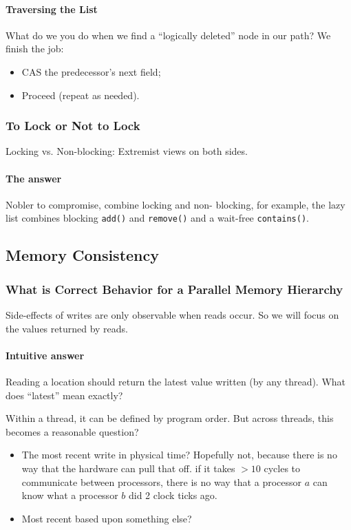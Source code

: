 \paragraph{Traversing the List} What do we you do when we find a \enquote{logically deleted} node in our path? We finish the job:
\begin{itemize}
    \item CAS the predecessor’s next field;
    \item Proceed (repeat as needed).
\end{itemize}

\subsubsection{To Lock or Not to Lock}
\par Locking vs. Non-blocking: Extremist views on both sides.
\paragraph{The answer} Nobler to compromise, combine locking and non- blocking, for example, the lazy list combines blocking \texttt{add()} and \texttt{remove()} and a wait-free \texttt{contains()}.
%
\clearpage
%
%
%
\subsection{Memory Consistency}
\subsubsection{What is Correct Behavior for a Parallel Memory Hierarchy}
\par Side-effects of writes are only observable when reads occur. So we will focus on the values returned by reads.
\paragraph{Intuitive answer} Reading a location should return the latest value written (by any thread). What does \enquote{latest} mean exactly?
\par Within a thread, it can be defined by program order. But across threads, this becomes a reasonable question?
\begin{itemize}
    \item The most recent write in physical time? Hopefully not, because there is no way that the hardware can pull that off. if it takes $> 10$ cycles to communicate between processors, there is no way that a processor $a$ can know what a processor $b$ did 2 clock ticks ago.
    \item Most recent based upon something else?
\end{itemize}
